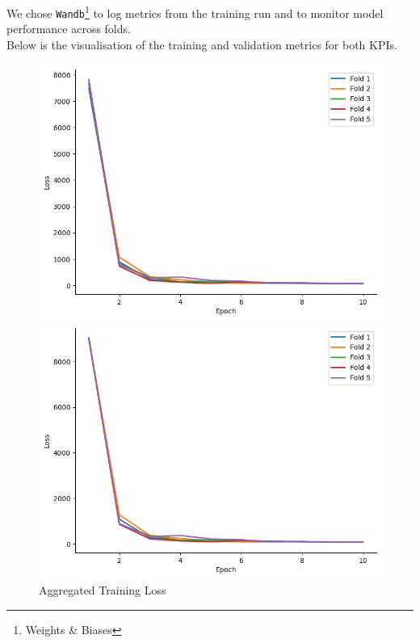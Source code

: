 \documentclass{report} %
\begin{document}
We chose \texttt{Wandb}\footnote{Weights \& Biases} to log metrics from the training run and to monitor model performance across folds. \\
Below is the visualisation of the training and validation metrics for both \ac{KPI}s.\\

\begin{figure}[H]
    \centering
    \begin{minipage}[b]{0.325\textwidth}
        \includegraphics[width=\textwidth]{./ReportImages/train_loss.png}
        \caption{\centering Aggregated Training Loss}
        \label{fig:Aggregated Training Loss}
    \end{minipage}
    \hfill
    \begin{minipage}[b]{0.325\textwidth}
        \includegraphics[width=\textwidth]{./ReportImages/train_loss_y1.png}

\end{minipage}
\end{figure}
\end{document}
